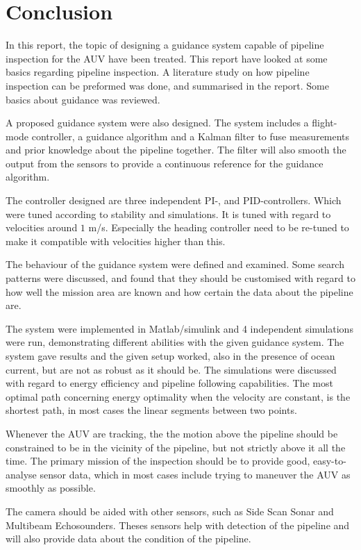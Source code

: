 \chapter{Conclusion}
	In this report, the topic of designing a guidance system capable of pipeline inspection 
	for the \hugin AUV have been treated. This report have looked at some basics regarding pipeline
	inspection. A literature study on how pipeline inspection can be preformed was done, and summarised in
	the report. Some basics about guidance was reviewed.

	A proposed guidance system were also designed. The system includes a flight-mode controller, a
	guidance algorithm and a Kalman filter to fuse measurements and prior knowledge about the pipeline
	together. The filter will also smooth the output from the sensors to provide a continuous reference
	for the guidance algorithm. 

	The controller designed are three independent PI-, and PID-controllers. Which were tuned according to
	stability and simulations. It is tuned with regard to velocities around $1$ m/s. Especially the heading
	controller need to be re-tuned to make it compatible with velocities higher than this.

	The behaviour of the guidance system were defined and examined. Some search patterns were discussed,
	and found that they should be customised with regard to how well the mission area are known and how
	certain the data about the pipeline are. 
	
	The system were implemented in Matlab/simulink and 4 independent simulations were run, demonstrating
	different abilities with the given guidance system. The system gave results and the given setup
	worked, also in the presence of ocean current, but are not as robust as it should be. The simulations
	were discussed with regard to energy
	efficiency and pipeline following capabilities. The most optimal path concerning energy
	optimality when the velocity are constant, is the shortest path, in most cases the linear segments
	between two points. 
	
	Whenever the AUV are tracking, the the motion above the pipeline should be constrained to be in the
	vicinity of the pipeline, but not strictly above it all the time. The primary mission of the inspection
	should be to provide good, easy-to-analyse sensor data, which in most cases include trying to maneuver 
	the AUV as smoothly as possible. 

	The camera should be aided with other sensors, such as Side Scan Sonar and Multibeam Echosounders.
	Theses sensors help with detection of the pipeline and will also provide data about the condition of
	the pipeline. 

